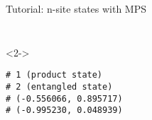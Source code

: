 \begin{frame}[fragile]{Tutorial: n-site states with MPS}
\begin{columns}
\begin{column}{4.5cm}
\begin{onlyenv}
\begin{lstlisting}[style=julia, numbers=none, mathescape, basicstyle=\small]
 \end{lstlisting}

\end{onlyenv}

\begin{onlyenv}<2->

\begin{lstlisting}[style=julia, numbers=none, mathescape, basicstyle=\small]
# 1 (product state)
# 2 (entangled state)
# (-0.556066, 0.895717)
# (-0.995230, 0.048939)
\end{lstlisting}

\end{onlyenv}

\end{column}

\end{columns}

\end{frame}
